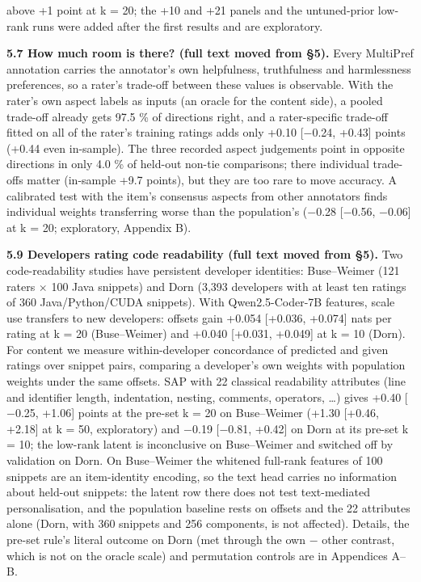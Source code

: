 \documentclass{article}
\begin{document}
above +1 point at k = 20; the +10 and +21 panels and the untuned-prior low-rank runs were added after the first results and are exploratory.

\textbf{5.7 How much room is there? (full text moved from \S{}5).} Every MultiPref annotation carries the annotator's own helpfulness, truthfulness and harmlessness preferences, so a rater's trade-off between these values is observable. With the rater's own aspect labels as inputs (an oracle for the content side), a pooled trade-off already gets 97.5 \% of directions right, and a rater-specific trade-off fitted on all of the rater's training ratings adds only +0.10 {[}$-$0.24, +0.43{]} points (+0.44 even in-sample). The three recorded aspect judgements point in opposite directions in only 4.0 \% of held-out non-tie comparisons; there individual trade-offs matter (in-sample +9.7 points), but they are too rare to move accuracy. A calibrated test with the item's consensus aspects from other annotators finds individual weights transferring worse than the population's ($-$0.28 {[}$-$0.56, $-$0.06{]} at k = 20; exploratory, Appendix B).

\textbf{5.9 Developers rating code readability (full text moved from \S{}5).} Two code-readability studies have persistent developer identities: Buse--Weimer (121 raters $\times$ 100 Java snippets) and Dorn (3,393 developers with at least ten ratings of 360 Java/Python/CUDA snippets). With Qwen2.5-Coder-7B features, scale use transfers to new developers: offsets gain +0.054 {[}+0.036, +0.074{]} nats per rating at k = 20 (Buse--Weimer) and +0.040 {[}+0.031, +0.049{]} at k = 10 (Dorn). For content we measure within-developer concordance of predicted and given ratings over snippet pairs, comparing a developer's own weights with population weights under the same offsets. SAP with 22 classical readability attributes (line and identifier length, indentation, nesting, comments, operators, \ldots) gives +0.40 {[}$-$0.25, +1.06{]} points at the pre-set k = 20 on Buse--Weimer (+1.30 {[}+0.46, +2.18{]} at k = 50, exploratory) and $-$0.19 {[}$-$0.81, +0.42{]} on Dorn at its pre-set k = 10; the low-rank latent is inconclusive on Buse--Weimer and switched off by validation on Dorn. On Buse--Weimer the whitened full-rank features of 100 snippets are an item-identity encoding, so the text head carries no information about held-out snippets: the latent row there does not test text-mediated personalisation, and the population baseline rests on offsets and the 22 attributes alone (Dorn, with 360 snippets and 256 components, is not affected). Details, the pre-set rule's literal outcome on Dorn (met through the own $-$ other contrast, which is not on the oracle scale) and permutation controls are in Appendices A--B.
\end{document}
